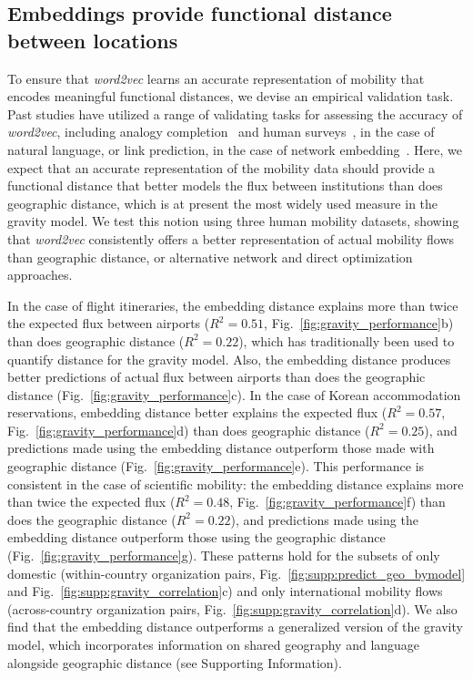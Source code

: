 \documentclass[12pt]{article} %
\def\SI{Supporting Information}
\begin{document}
%
%
%
\subsection*{Embeddings provide functional distance between locations}

To ensure that \textit{word2vec} learns an accurate representation of mobility that encodes meaningful functional distances, we devise an empirical validation task.
Past studies have utilized a range of validating tasks for assessing the accuracy of \textit{word2vec}, including analogy completion~\cite{mikolov2013word2vec} and human surveys~\cite{kozlowski2018geometry}, in the case of natural language, or link prediction, in the case of network embedding~\cite{perozzi2014deepwalk, grover2016node2vec}.
Here, we expect that an accurate representation of the mobility data should provide a functional distance that better models the flux between institutions than does geographic distance, which is at present the most widely used measure in the gravity model.
We test this notion using three human mobility datasets, showing that \textit{word2vec} consistently offers a better representation of actual mobility flows than geographic distance, or alternative network and direct optimization approaches.


In the case of flight itineraries, the embedding distance explains more than twice the expected flux between airports ($R^{2} = 0.51$, Fig.~\ref{fig:gravity_performance}b) than does geographic distance ($R^{2} = 0.22$), which has traditionally been used to quantify distance for the gravity model.
Also, the embedding distance produces better predictions of actual flux between airports than does the geographic distance (Fig.~\ref{fig:gravity_performance}c).
In the case of Korean accommodation reservations, embedding distance better explains the expected flux ($R^{2} = 0.57$, Fig.~\ref{fig:gravity_performance}d) than does geographic distance ($R^{2} = 0.25$), and predictions made using the embedding distance outperform those made with geographic distance (Fig.~\ref{fig:gravity_performance}e).
This performance is consistent in the case of scientific mobility:
the embedding distance explains more than twice the expected flux ($R^{2} = 0.48$, Fig.~\ref{fig:gravity_performance}f) than does the geographic distance ($R^{2} = 0.22$), and predictions made using the embedding distance outperform those using the geographic distance (Fig.~\ref{fig:gravity_performance}g).
These patterns hold for the subsets of only domestic (within-country organization pairs, Fig.~\ref{fig:supp:predict_geo_bymodel} and Fig.~\ref{fig:supp:gravity_correlation}c) and only international mobility flows (across-country organization pairs, Fig.~\ref{fig:supp:gravity_correlation}d).
We also find that the embedding distance outperforms a generalized version of the gravity model, which incorporates information on shared geography and language alongside geographic distance (see \SI). 
\end{document}
